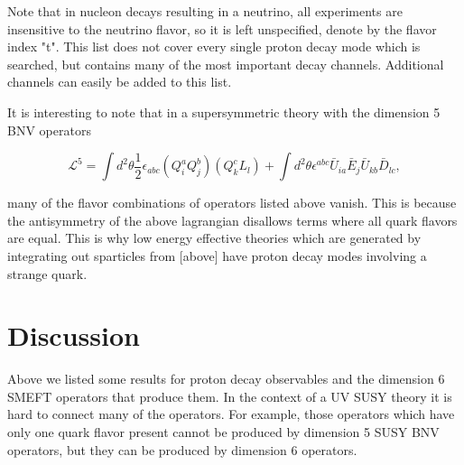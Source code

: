 \documentclass[aps,onecolumn,twoside,secnumarabic,balancelastpage,amsmath,amssymb,nofootinbib,hyperref=pdftex]{revtex4}
\begin{document}
Note that in nucleon decays resulting in a neutrino, all experiments are insensitive to the neutrino flavor, so it is left unspecified, denote by the flavor index "t". This list does not cover every single proton decay mode which is searched, but contains many of the most important decay channels. Additional channels can easily be added to this list.

It is interesting to note that in a supersymmetric theory with the dimension 5 BNV operators

\begin{equation}
\mathcal{L}^{5} = \int d^{2}\theta \frac{1}{2}\epsilon_{abc}(Q^{a}_{i}Q^{b}_{j})(Q^{c}_{k}L_{l}) + \int d^{2}\theta \epsilon^{abc}\bar{U}_{ia}\bar{E}_{j}\bar{U}_{kb}\bar{D}_{lc},
\end{equation}

many of the flavor combinations of operators listed above vanish. This is because the antisymmetry of the above lagrangian disallows terms where all quark flavors are equal. This is why low energy effective theories which are generated by integrating out sparticles from [above] have proton decay modes involving a strange quark.

\section{Discussion}

Above we listed some results for proton decay observables and the dimension 6 SMEFT operators that produce them. In the context of a UV SUSY theory it is hard to connect many of the operators. For example, those operators which have only one quark flavor present cannot be produced by dimension 5 SUSY BNV operators, but they can be produced by dimension 6 operators. 
\end{document}
